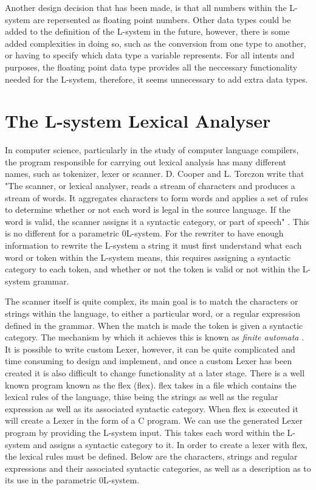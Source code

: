 Another design decision that has been made, is that all numbers within the L-system are repersented as floating point numbers. Other data types could be added to the definition of the L-system in the future, however, there is some added complexities in doing so, such as the conversion from one type to another, or having to specify which data type a variable represents. For all intents and purposes, the floating point data type provides all the neccessary functionality needed for the L-system, therefore, it seems unnecessary to add extra data types. 

\section{The L-system Lexical Analyser} \label{Flex}

In computer science, particularly in the study of computer language compilers, the program responsible for carrying out lexical analysis has many different names, such as tokenizer, lexer or scanner. D. Cooper and L. Torczon write that "The scanner, or lexical analyser, reads a stream of characters and produces a stream of words. It aggregates characters to form words and applies a set of rules to determine whether or not each word is legal in the source language. If the word is valid, the scanner assigns it a syntactic category, or part of speech" \cite{cooper2011engineering}. This is no different for a parametric 0L-system. For the rewriter to have enough information to rewrite the L-system a string it must first understand what each word or token within the L-system means, this requires assigning a syntactic category to each token, and whether or not the token is valid or not within the L-system grammar. 

The scanner itself is quite complex, its main goal is to match the characters or strings within the language, to either a particular word, or a regular expression defined in the grammar. When the match is made the token is given a syntactic category. The mechanism by which it achieves this is known as \textit{finite automata} \cite{wilhelm2013compiler}. It is possible to write custom \gls{Lexer}, however, it can be quite complicated and time consuming to design and implement, and once a custom \gls{Lexer} has been created it is also difficult to change functionality at a later stage. There is a well known program known as the \acrlong{flex} (\acrshort{flex}). \acrshort{flex} takes in a file which contains the lexical rules of the language, thise being the strings as well as the regular expression as well as its associated syntactic category. When \acrshort{flex} is executed it will create a \gls{Lexer} in the form of a C program. We can use the generated Lexer program by providing the L-system input. This takes each word within the L-system and assigns a syntactic category to it. In order to create a lexer with \acrshort{flex}, the lexical rules must be defined. Below are the characters, strings and regular expressions and their associated syntactic categories, as well as a description as to its use in the parametric 0L-system.

